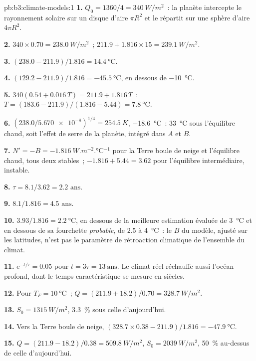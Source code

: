 \begin{solution}{pb:b3:climate-models:1}
\textbf{1.} $Q_0 = 1360/4 = \qty{340}{W/m^2}$~: la planète intercepte le
rayonnement solaire sur un disque d'aire $\pi R^2$ et le répartit sur une sphère d'aire
$4\pi R^2$.

\textbf{2.} $340\times0.70 = \qty{238.0}{W/m^2}$~; $211.9 + 1.816\times15 =
\qty{239.1}{W/m^2}$.

\textbf{3.} $(238.0 - 211.9)/1.816 = \qty{14.4}{\celsius}$.

\textbf{4.} $(129.2 - 211.9)/1.816 = \qty{-45.5}{\celsius}$, en dessous de
\qty{-10}{\celsius}.

\textbf{5.} $340(0.54 + 0.016\,T) = 211.9 + 1.816\,T$~: $T =
(183.6 - 211.9)/(1.816 - 5.44) = \qty{7.8}{\celsius}$.

\textbf{6.} $(238.0/\num{5.670e-8})^{1/4} = \qty{254.5}{K}$,
\qty{-18.6}{\celsius}~: \qty{33}{\celsius} sous l'équilibre chaud, soit
l'effet de serre de la planète, intégré dans $A$ et $B$.

\textbf{7.} $N' = -B = \qty{-1.816}{W.m^{-2}.\celsius^{-1}}$ pour la
Terre boule de neige et l'équilibre chaud, tous deux stables~; $-1.816 + 5.44 =
\num{+3.62}$ pour l'équilibre intermédiaire, instable.

\textbf{8.} $\tau = 8.1/3.62 = \num{2.2}\text{ ans}$.

\textbf{9.} $8.1/1.816 = \num{4.5}\text{ ans}$.

\textbf{10.} $3.93/1.816 = \qty{2.2}{\celsius}$, en dessous de la meilleure
estimation évaluée de \qty{3}{\celsius} et en dessous de sa fourchette \emph{probable}, de 2.5 à
\qty{4}{\celsius}~: le $B$ du modèle, ajusté sur les latitudes, n'est pas
le paramètre de rétroaction climatique de l'ensemble du climat.

\textbf{11.} $\mathrm e^{-t/\tau} = 0.05$ pour $t = 3\tau =
\num{13}~\text{ans}$. Le climat réel réchauffe aussi l'océan profond, dont le
temps caractéristique se mesure en siècles.

\textbf{12.} Pour $T_F = \qty{10}{\celsius}$~; $Q = (211.9 + 18.2)/0.70 =
\qty{328.7}{W/m^2}$.

\textbf{13.} $S_0 = \qty{1315}{W/m^2}$, \qty{3.3}{\percent} sous celle d'aujourd'hui.

\textbf{14.} Vers la Terre boule de neige, $(328.7\times0.38 - 211.9)/1.816 =
\qty{-47.9}{\celsius}$.

\textbf{15.} $Q = (211.9 - 18.2)/0.38 = \qty{509.8}{W/m^2}$, $S_0 =
\qty{2039}{W/m^2}$, \qty{50}{\percent} au-dessus de celle d'aujourd'hui.


\end{solution}

